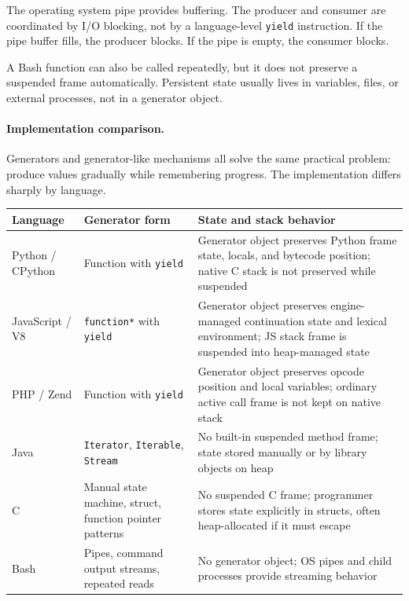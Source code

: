 The operating system pipe provides buffering. The producer and consumer are coordinated by I/O blocking, not by a language-level \texttt{yield} instruction. If the pipe buffer fills, the producer blocks. If the pipe is empty, the consumer blocks.

A Bash function can also be called repeatedly, but it does not preserve a suspended frame automatically. Persistent state usually lives in variables, files, or external processes, not in a generator object.

\paragraph{Implementation comparison.}

Generators and generator-like mechanisms all solve the same practical problem: produce values gradually while remembering progress. The implementation differs sharply by language.

\begin{center}
\begin{tabular}{|p{}|p{}|p{}|}
\hline
\textbf{Language} & \textbf{Generator form} & \textbf{State and stack behavior} \\
\hline
Python / CPython & Function with \texttt{yield} & Generator object preserves Python frame state, locals, and bytecode position; native C stack is not preserved while suspended \\
\hline
JavaScript / V8 & \texttt{function*} with \texttt{yield} & Generator object preserves engine-managed continuation state and lexical environment; JS stack frame is suspended into heap-managed state \\
\hline
PHP / Zend & Function with \texttt{yield} & Generator object preserves opcode position and local variables; ordinary active call frame is not kept on native stack \\
\hline
Java & \texttt{Iterator}, \texttt{Iterable}, \texttt{Stream} & No built-in suspended method frame; state stored manually or by library objects on heap \\
\hline
C & Manual state machine, struct, function pointer patterns & No suspended C frame; programmer stores state explicitly in structs, often heap-allocated if it must escape \\
\hline
Bash & Pipes, command output streams, repeated reads & No generator object; OS pipes and child processes provide streaming behavior \\
\hline
\end{tabular}
\end{center}

